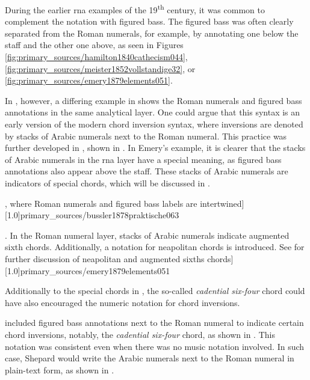 
During the earlier \gls{rna} examples of the
19\textsuperscript{th} century, it was common to complement
the notation with figured bass. The figured bass was often
clearly separated from the Roman numerals, for example, by
annotating one below the staff and the other one above, as
seen in Figures
\ref{fig:primary_sources/hamilton1840cathecism044},
\ref{fig:primary_sources/meister1852vollstandige32}, or
\ref{fig:primary_sources/emery1879elements051}.

In ,
however, a differing example in
\textcite{bussler1878praktische} shows the Roman numerals
and figured bass annotations in the same analytical layer.
One could argue that this syntax is an early version of the
modern chord inversion syntax, where inversions are denoted
by stacks of Arabic numerals next to the Roman numeral. This
practice was further developed in
\textcite{emery1879elements}, shown in
. In Emery's
example, it is clearer that the stacks of Arabic numerals in
the \gls{rna} layer have a special meaning, as figured bass
annotations also appear above the staff. These stacks of
Arabic numerals are indicators of special chords, which will
be discussed in
.

\phdfigure[A single layer of chord annotations underneath
 the bass staff in \textcite[p.~63]{bussler1878praktische},
 where Roman numerals and figured bass labels are
 intertwined][1.0]{primary_sources/bussler1878praktische063}

\phdfigure[Use of Roman numerals and figured bass in
\textcite[p.~51]{emery1879elements}. In the Roman numeral
layer, stacks of Arabic numerals indicate augmented sixth
chords. Additionally, a notation for \gls{neapolitan} chords
is introduced. See
for further discussion of \gls{neapolitan} and augmented
sixths chords][1.0]{primary_sources/emery1879elements051}

Additionally to the special chords in
\textcite{emery1879elements}, the so-called \emph{cadential
six-four} chord could have also encouraged the numeric
notation for chord inversions.

\textcite{shepard1896harmony} included figured bass
annotations next to the Roman numeral to indicate certain
chord inversions, notably, the \emph{cadential six-four}
chord, as shown in
. This
notation was consistent even when there was no music
notation involved. In such case, Shepard would write the
Arabic numerals next to the Roman numeral in plain-text
form, as shown in
.

